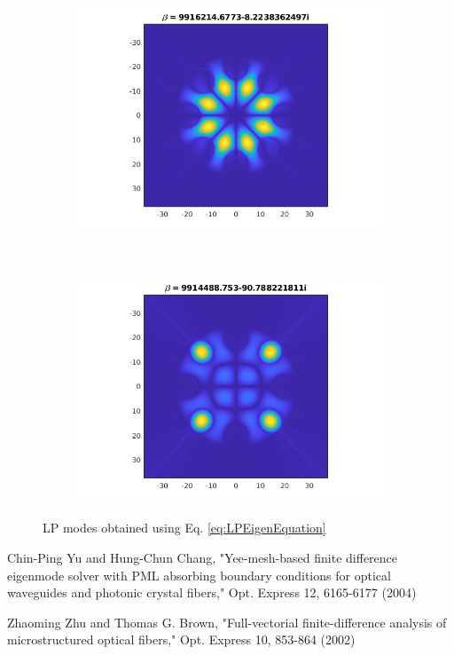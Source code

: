 \documentclass[]{article}
\begin{document}
\begin{figure}[htb]
\begin{subfigure}{0.3\textwidth}
	\end{subfigure}
	~
	\begin{subfigure}{0.3\textwidth}
		\includegraphics[width=\textwidth]{Figures/LP41}
	\end{subfigure}
	~
	\begin{subfigure}{0.3\textwidth}
		\includegraphics[width=\textwidth]{Figures/Non Guided}
	\end{subfigure}
\caption{LP modes obtained using Eq. \ref{eq:LPEigenEquation}}
\label{fig:LPModePlots}
\end{figure}

\begin{thebibliography}{9}
	Chin-Ping Yu and Hung-Chun Chang, "Yee-mesh-based finite difference eigenmode solver with PML absorbing boundary conditions for optical waveguides and photonic crystal fibers," Opt. Express 12, 6165-6177 (2004)
	
	Zhaoming Zhu and Thomas G. Brown, "Full-vectorial finite-difference analysis of microstructured optical fibers," Opt. Express 10, 853-864 (2002)
\end{thebibliography}








	
\end{document}

